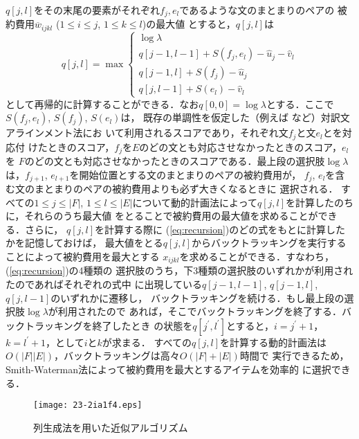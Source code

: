 \documentclass[japanese]{jnlp_1.4}
\begin{document}
$q[j,l]$をその末尾の要素がそれぞれ$f_j, e_l$であるような文のまとまりのペアの
被約費用$\overline{w}_{ijkl}$ ($1 \leq i \leq j$, $1 \leq k \leq l$)の最大値
とすると，$q[j,l]$は
\begin{equation}
 \label{eq:recursion}
 q[j,l] = \max \left\{
           \begin{array}{l}
            \log \lambda \\
            q[j-1,l-1] + S(f_j, e_l) - \hat{u}_j - \hat{v}_l \\
            q[j-1,l] + S(f_j) - \hat{u}_j \\
            q[j,l-1] + S(e_l) - \hat{v}_l
           \end{array}
          \right.
\end{equation}
として再帰的に計算することができる．なお$q[0,0] = \log \lambda$とする．ここで$S(f_j, e_l)$, $S(f_j)$, $S(e_l)$は，
既存の単調性を仮定した（例えば \cite{moore02:_fast}など）対訳文アラインメント法にお
いて利用されるスコアであり，それぞれ文$f_j$と文$e_l$とを対応付
けたときのスコア，$f_j$を$E$のどの文とも対応させなかったときのスコア，$e_l$を
$F$のどの文とも対応させなかったときのスコアである．最上段の選択肢$\log
\lambda$は，$f_{j+1}$, $e_{l+1}$を開始位置とする文のまとまりのペアの被約費用が，
$f_{j}$, $e_{l}$を含む文のまとまりのペアの被約費用よりも必ず大きくなるときに
選択される．
すべての$1 \leq j \leq
|F|$, $1 \leq l \leq |E|$について動的計画法によって$q[j,l]$を計算したのちに，それらのうち最大値
をとることで被約費用の最大値を求めることができる．さらに，
$q[j, l]$を計算する際に (\ref{eq:recursion})のどの式をもとに計算したかを記憶しておけば，
最大値をとる$q[j, l]$からバックトラッキングを実行することによって被約費用を最大とする
$x_{ijkl}$を求めることができる．すなわち，(\ref{eq:recursion})の4種類の
選択肢のうち，下3種類の選択肢のいずれかが利用されたのであればそれぞれの式中
に出現している$q[j-1, l-1]$, $q[j-1, l]$, $q[j, l-1]$のいずれかに遷移し，
バックトラッキングを続ける．もし最上段の選択肢$\log \lambda$が利用されたので
あれば，そこでバックトラッキングを終了する．バックトラッキングを終了したとき
の状態を$q[j^\prime, l^\prime]$とすると，$i = j^{\prime} + 1$，$k =
l^{\prime} + 1$，として$i$と$k$が求まる．
すべての$q[j, l]$を計算する動的計画法は
$O(|F||E|)$，バックトラッキングは高々$O(|F| + |E|)$時間で
実行できるため，Smith-Waterman法によって被約費用を最大とするアイテムを効率的
に選択できる．

\begin{figure}[b]
\vspace{-0.5\Cvs}
\begin{center}
\texttt{[image: 23-2ia1f4.eps]}
\end{center}
\caption{列生成法を用いた近似アルゴリズム}
\label{fig:colgen}
\vspace{-0.5\Cvs}
\end{figure}
\end{document}
